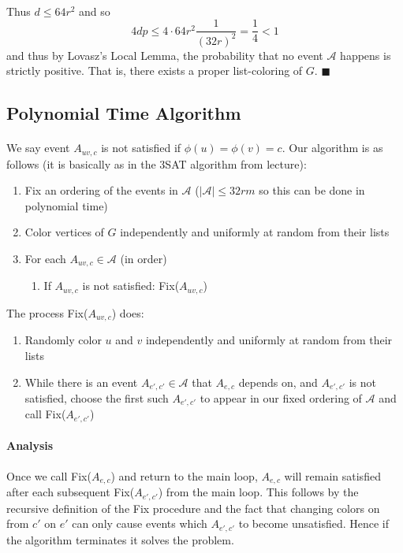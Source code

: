\documentclass[letterpaper,12pt,oneside,onecolumn]{article}
\newcommand{\cA}{\mathcal{A}} \newcommand{\cB}{\mathcal{B}}
\begin{document}
\paragraph{}
Thus $d\leq 64r^2$ and so
$$4dp \leq 4 \cdot 64r^2 \frac{1}{(32r)^2} = \frac{1}{4} < 1$$
and thus by Lovasz's Local Lemma, the probability that no event $\cA$ happens is strictly positive. That is, there exists a proper list-coloring of $G$. $\blacksquare$
\subsection*{Polynomial Time Algorithm}
\paragraph{}
We say event $A_{uv,c}$ is not satisfied if $\phi(u) = \phi(v) = c$. Our algorithm is as follows (it is basically as in the $3$SAT algorithm from lecture):
\begin{enumerate}
    \item Fix an ordering of the events in $\cA$ ($|\cA| \leq 32rm$ so this can be done in polynomial time)
    \item Color vertices of $G$ independently and uniformly at random from their lists
    \item For each $A_{uv, c} \in \cA$ (in order)
        \begin{enumerate}
            \item If $A_{uv,c}$ is not satisfied: Fix($A_{uv,c}$)
        \end{enumerate}
\end{enumerate}
The process Fix($A_{uv,c}$) does:
\begin{enumerate}
    \item Randomly color $u$ and $v$ independently and uniformly at random from their lists
    \item While there is an event $A_{e', c'} \in \cA$ that $A_{e,c}$ depends on, and $A_{e',c'}$ is not satisfied, choose the first such $A_{e',c'}$ to appear in our fixed ordering of $\cA$ and call Fix($A_{e',c'}$)
\end{enumerate}
\paragraph{Analysis}
Once we call Fix($A_{e,c}$) and return to the main loop, $A_{e,c}$ will remain satisfied after each subsequent Fix($A_{e',c'}$) from the main loop. This follows by the recursive definition of the Fix procedure and the fact that changing colors on from $c'$ on $e'$ can only cause events which $A_{e', c'}$ to become unsatisfied. Hence if the algorithm terminates it solves the problem.
\end{document}
